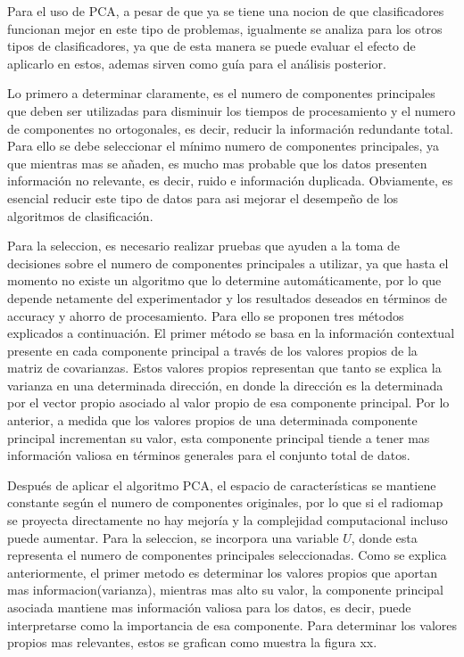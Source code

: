 Para el uso de PCA, a pesar de que ya se tiene una nocion  de que clasificadores funcionan mejor en este tipo de problemas, igualmente se analiza para los otros tipos de clasificadores, ya que de esta manera se puede evaluar el efecto de aplicarlo en estos, ademas sirven como guía para el análisis posterior.

Lo primero a determinar claramente, es el numero de componentes principales que deben ser utilizadas para disminuir los tiempos de procesamiento y el numero de componentes no ortogonales, es decir, reducir la información redundante total. Para ello se debe seleccionar el mínimo numero de componentes principales, ya que mientras mas se añaden, es mucho mas probable que los datos presenten información no relevante, es decir, ruido e información duplicada. Obviamente, es esencial reducir este tipo de datos para asi mejorar el desempeño de los algoritmos de clasificación.

Para la seleccion, es necesario realizar pruebas que ayuden a la toma de decisiones sobre el numero de componentes principales a utilizar, ya que hasta el momento no existe un algoritmo que lo determine automáticamente, por lo que depende netamente del experimentador y los resultados deseados en términos de accuracy y ahorro de procesamiento. Para ello se proponen tres métodos explicados a continuación. El primer método se basa en la información contextual presente en cada componente principal a través de los valores propios de la matriz de covarianzas. Estos valores propios representan que tanto se explica la varianza en una determinada dirección, en donde la dirección es la determinada por el vector propio asociado al valor propio de esa componente principal. Por lo anterior, a medida que los valores propios de una determinada componente principal incrementan su valor, esta componente principal tiende a tener mas información valiosa en términos generales para el conjunto total de datos. 

Después de aplicar el algoritmo PCA, el espacio de características se mantiene constante según el numero de componentes originales, por lo que si el radiomap se proyecta directamente no hay mejoría y la complejidad computacional incluso puede aumentar. Para la seleccion, se incorpora una variable $U$, donde esta representa el numero de componentes principales seleccionadas. Como se explica anteriormente, el primer metodo es determinar los valores propios que aportan mas informacion(varianza), mientras mas alto su valor, la componente principal asociada mantiene mas información valiosa para los datos, es decir, puede interpretarse como la importancia de esa componente. Para determinar los valores propios mas relevantes, estos se grafican como muestra la figura xx.

